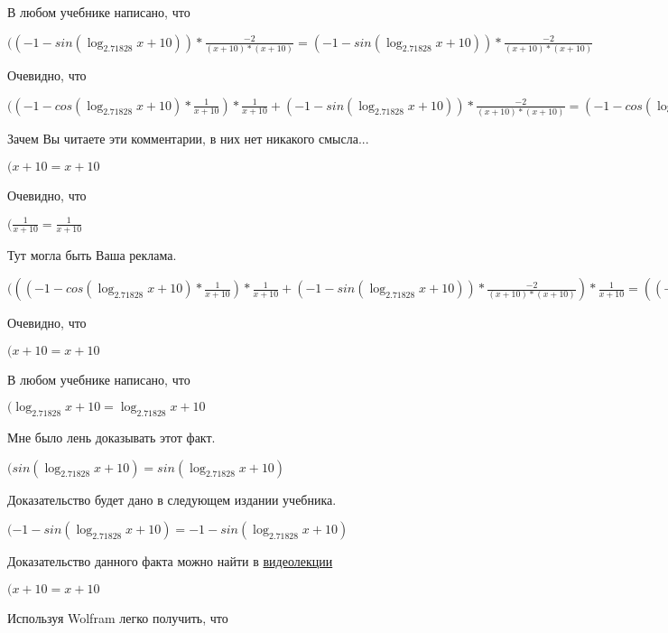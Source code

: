 \documentclass[12pt,a4paper,fleqn]{article}
\theoremstyle{definition}
\begin{document}
В любом учебнике написано, что

$(( -1  - sin(\log_{ 2.71828 }{ x  +  10 })) * \frac{ -2 }{( x  +  10 ) * ( x  +  10 )}
 = ( -1  - sin(\log_{ 2.71828 }{ x  +  10 })) * \frac{ -2 }{( x  +  10 ) * ( x  +  10 )}
$

Очевидно, что

$(( -1  - cos(\log_{ 2.71828 }{ x  +  10 }) * \frac{ 1 }{ x  +  10 }
) * \frac{ 1 }{ x  +  10 }
 + ( -1  - sin(\log_{ 2.71828 }{ x  +  10 })) * \frac{ -2 }{( x  +  10 ) * ( x  +  10 )}
 = ( -1  - cos(\log_{ 2.71828 }{ x  +  10 }) * \frac{ 1 }{ x  +  10 }
) * \frac{ 1 }{ x  +  10 }
 + ( -1  - sin(\log_{ 2.71828 }{ x  +  10 })) * \frac{ -2 }{( x  +  10 ) * ( x  +  10 )}
$

Зачем Вы читаете эти комментарии, в них нет никакого смысла...

$( x  +  10  =  x  +  10 $

Очевидно, что

$(\frac{ 1 }{ x  +  10 }
 = \frac{ 1 }{ x  +  10 }
$

Тут могла быть Ваша реклама.

$((( -1  - cos(\log_{ 2.71828 }{ x  +  10 }) * \frac{ 1 }{ x  +  10 }
) * \frac{ 1 }{ x  +  10 }
 + ( -1  - sin(\log_{ 2.71828 }{ x  +  10 })) * \frac{ -2 }{( x  +  10 ) * ( x  +  10 )}
) * \frac{ 1 }{ x  +  10 }
 = (( -1  - cos(\log_{ 2.71828 }{ x  +  10 }) * \frac{ 1 }{ x  +  10 }
) * \frac{ 1 }{ x  +  10 }
 + ( -1  - sin(\log_{ 2.71828 }{ x  +  10 })) * \frac{ -2 }{( x  +  10 ) * ( x  +  10 )}
) * \frac{ 1 }{ x  +  10 }
$

Очевидно, что

$( x  +  10  =  x  +  10 $

В любом учебнике написано, что

$(\log_{ 2.71828 }{ x  +  10 } = \log_{ 2.71828 }{ x  +  10 }$

Мне было лень доказывать этот факт.

$(sin(\log_{ 2.71828 }{ x  +  10 }) = sin(\log_{ 2.71828 }{ x  +  10 })$

Доказательство будет дано в следующем издании учебника.

$( -1  - sin(\log_{ 2.71828 }{ x  +  10 }) =  -1  - sin(\log_{ 2.71828 }{ x  +  10 })$

Доказательство данного факта можно найти в \href{https://www.youtube.com/watch?v=dQw4w9WgXcQ}{видеолекции}

$( x  +  10  =  x  +  10 $

Используя Wolfram легко получить, что
\end{document}

